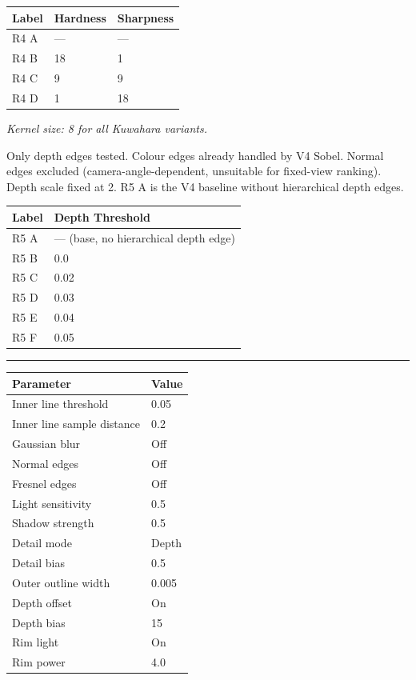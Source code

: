\documentclass[11pt,a4paper]{article}
\begin{document}
\smallskip
\begin{tabular}{lll}
\toprule
\textbf{Label} & \textbf{Hardness} & \textbf{Sharpness} \\
\midrule
R4 A & --- & --- \\
R4 B & 18  & 1   \\
R4 C & 9   & 9   \\
R4 D & 1   & 18  \\
\bottomrule
\end{tabular}

\smallskip
\noindent\textit{Kernel size: 8 for all Kuwahara variants.}

\bigskip


\noindent Only depth edges tested. Colour edges already handled by V4 Sobel. Normal edges excluded (camera-angle-dependent, unsuitable for fixed-view ranking). Depth scale fixed at 2. R5 A is the V4 baseline without hierarchical depth edges.

\smallskip
\begin{tabular}{ll}
\toprule
\textbf{Label} & \textbf{Depth Threshold} \\
\midrule
R5 A & --- (base, no hierarchical depth edge) \\
R5 B & 0.0  \\
R5 C & 0.02 \\
R5 D & 0.03 \\
R5 E & 0.04 \\
R5 F & 0.05 \\
\bottomrule
\end{tabular}

\bigskip
\noindent\rule{\linewidth}{0.4pt}


\smallskip
\begin{tabular}{ll}
\toprule
\textbf{Parameter} & \textbf{Value} \\
\midrule
Inner line threshold        & 0.05 \\
Inner line sample distance  & 0.2  \\
Gaussian blur               & Off  \\
Normal edges                & Off  \\
Fresnel edges               & Off  \\
Light sensitivity           & 0.5  \\
Shadow strength             & 0.5  \\
Detail mode                 & Depth \\
Detail bias                 & 0.5  \\
Outer outline width         & 0.005 \\
Depth offset                & On   \\
Depth bias                  & 15   \\
Rim light                   & On   \\
Rim power                   & 4.0  \\
\bottomrule
\end{tabular}
\end{document}
